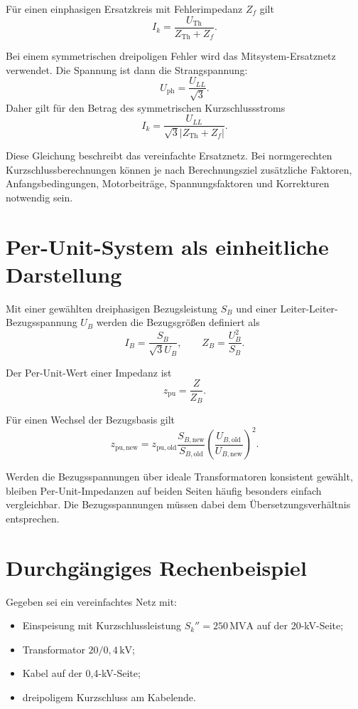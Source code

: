 Für einen einphasigen Ersatzkreis mit Fehlerimpedanz \(Z_f\) gilt
\[
  I_k=\frac{U_{\mathrm{Th}}}{Z_{\mathrm{Th}}+Z_f}.
\]

Bei einem symmetrischen dreipoligen Fehler wird das Mitsystem-Ersatznetz
verwendet. Die Spannung ist dann die Strangspannung:
\[
  U_{\mathrm{ph}}=\frac{U_{LL}}{\sqrt{3}}.
\]
Daher gilt für den Betrag des symmetrischen Kurzschlussstroms
\[
  I_k=\frac{U_{LL}}{\sqrt{3}|Z_{\mathrm{Th}}+Z_f|}.
\]

Diese Gleichung beschreibt das vereinfachte Ersatznetz. Bei normgerechten
Kurzschlussberechnungen können je nach Berechnungsziel zusätzliche Faktoren,
Anfangsbedingungen, Motorbeiträge, Spannungsfaktoren und Korrekturen
notwendig sein.

\section{Per-Unit-System als einheitliche Darstellung}

Mit einer gewählten dreiphasigen Bezugsleistung \(S_B\) und einer
Leiter-Leiter-Bezugsspannung \(U_B\) werden die Bezugsgrößen definiert als
\[
  I_B=\frac{S_B}{\sqrt{3}U_B},
  \qquad
  Z_B=\frac{U_B^2}{S_B}.
\]

Der Per-Unit-Wert einer Impedanz ist
\[
  z_{\mathrm{pu}}=\frac{Z}{Z_B}.
\]

Für einen Wechsel der Bezugsbasis gilt
\[
  z_{\mathrm{pu,new}}
  =z_{\mathrm{pu,old}}
   \frac{S_{B,\mathrm{new}}}{S_{B,\mathrm{old}}}
   \left(\frac{U_{B,\mathrm{old}}}{U_{B,\mathrm{new}}}\right)^2.
\]

Werden die Bezugsspannungen über ideale Transformatoren konsistent gewählt,
bleiben Per-Unit-Impedanzen auf beiden Seiten häufig besonders einfach
vergleichbar. Die Bezugsspannungen müssen dabei dem Übersetzungsverhältnis
entsprechen.

\section{Durchgängiges Rechenbeispiel}

Gegeben sei ein vereinfachtes Netz mit:
\begin{itemize}
  \item Einspeisung mit Kurzschlussleistung \(S_k''=250\,\mathrm{MVA}\)
        auf der 20-kV-Seite;
  \item Transformator \(20/0{,}4\,\mathrm{kV}\);
  \item Kabel auf der 0{,}4-kV-Seite;
  \item dreipoligem Kurzschluss am Kabelende.
\end{itemize}

